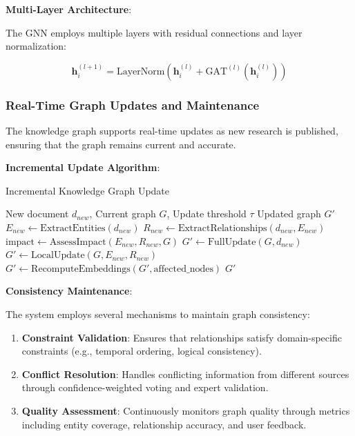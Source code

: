 \documentclass[10pt,twocolumn]{article}
\begin{document}
\textbf{Multi-Layer Architecture}:

The GNN employs multiple layers with residual connections and layer normalization:

\begin{equation}
\mathbf{h}_i^{(l+1)} = \text{LayerNorm}(\mathbf{h}_i^{(l)} + \text{GAT}^{(l)}(\mathbf{h}_i^{(l)}))
\end{equation}

\subsubsection{Real-Time Graph Updates and Maintenance}

The knowledge graph supports real-time updates as new research is published, ensuring that the graph remains current and accurate.

\textbf{Incremental Update Algorithm}:
\begin{algorithm}[H]
\caption{Incremental Knowledge Graph Update}
\label{alg:incremental_update}
\begin{algorithmic}[1]
\REQUIRE New document $d_{new}$, Current graph $G$, Update threshold $\tau$
\ENSURE Updated graph $G'$
\STATE $E_{new} \leftarrow \text{ExtractEntities}(d_{new})$
\STATE $R_{new} \leftarrow \text{ExtractRelationships}(d_{new}, E_{new})$
\STATE $\text{impact} \leftarrow \text{AssessImpact}(E_{new}, R_{new}, G)$
    \STATE $G' \leftarrow \text{FullUpdate}(G, d_{new})$
\ELSE
    \STATE $G' \leftarrow \text{LocalUpdate}(G, E_{new}, R_{new})$
\ENDIF
\STATE $G' \leftarrow \text{RecomputeEmbeddings}(G', \text{affected\_nodes})$
\RETURN $G'$
\end{algorithmic}
\end{algorithm}

\textbf{Consistency Maintenance}:

The system employs several mechanisms to maintain graph consistency:

\begin{enumerate}
    \item \textbf{Constraint Validation}: Ensures that relationships satisfy domain-specific constraints (e.g., temporal ordering, logical consistency).
    
    \item \textbf{Conflict Resolution}: Handles conflicting information from different sources through confidence-weighted voting and expert validation.
    
    \item \textbf{Quality Assessment}: Continuously monitors graph quality through metrics including entity coverage, relationship accuracy, and user feedback.
\end{enumerate}
\end{document}
